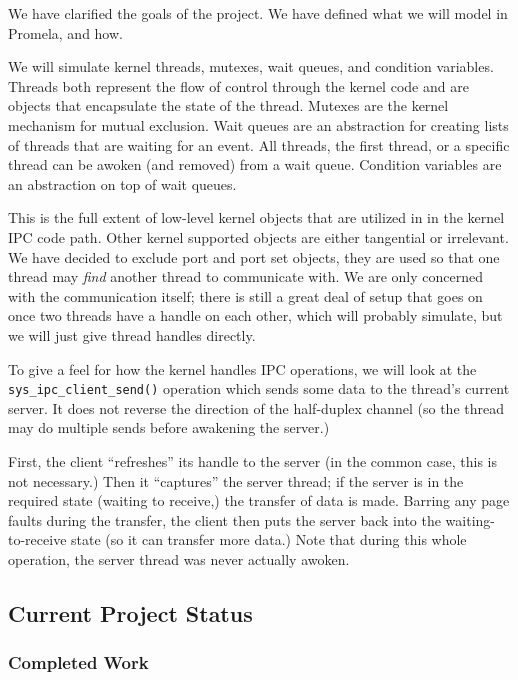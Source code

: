 We have clarified the goals of the project.  We have defined
what we will model in Promela, and how.

We will simulate kernel threads, mutexes, wait queues, and condition
variables.  Threads both represent the flow of control through the
kernel code and are objects that encapsulate the state of the thread.
Mutexes are the kernel mechanism for mutual exclusion.  Wait queues
are an abstraction for creating lists of threads that are waiting for
an event.  All threads, the first thread, or a specific thread can be
awoken (and removed) from a wait queue.  Condition variables are an
abstraction on top of wait queues.

This is the full extent of low-level kernel objects that are utilized
in in the kernel IPC code path.  Other kernel supported objects are
either tangential or irrelevant.  We have decided to exclude port and
port set objects, they are used so that one thread may {\em find}
another thread to communicate with.  We are only concerned with the
communication itself;  there is still a great deal of setup that
goes on once two threads have a handle on each other, which will
probably simulate, but we will just give thread handles directly. 

To give a feel for how the kernel handles IPC operations, we will look
at the {\tt sys_ipc_client_send()} operation which sends some data to
the thread's current server.  It does not reverse the direction of the
half-duplex channel (so the thread may do multiple sends before
awakening the server.)

First, the client ``refreshes'' its handle to the server (in the
common case, this is not necessary.)  Then it ``captures'' the server
thread; if the server is in the required state (waiting to receive,)
the transfer of data is made.  Barring any page faults during the
transfer, the client then puts the server back into the 
waiting-to-receive state (so it can transfer more data.)  Note that
during this whole operation, the server thread was never actually awoken.

\subsection*{Current Project Status}

\subsubsection*{Completed Work}

